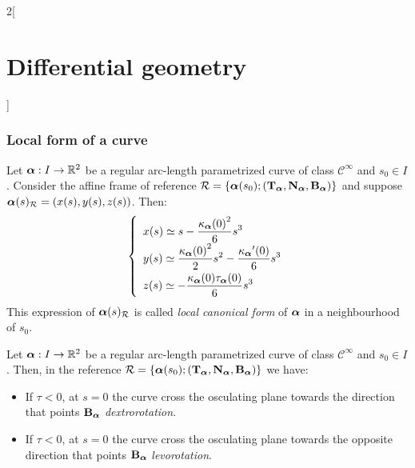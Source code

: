 \documentclass[../../../main.tex]{subfiles}
\begin{document}
\begin{multicols}{2}[\section{Differential geometry}]
  \subsubsection{Local form of a curve}
  \begin{definition}
    Let $\boldsymbol{\mathrm{\alpha}}:I\rightarrow\mathbb{R}^2$ be a regular arc-length parametrized curve of class $\mathcal{C}^\infty$ and $s_0\in I$. Consider the affine frame of reference $\mathcal{R}=\{\boldsymbol{\mathrm{\alpha}}(s_0);({\boldsymbol{\mathrm{T}}_{\boldsymbol{\mathrm{\alpha}}}},{\boldsymbol{\mathrm{N}}_{\boldsymbol{\mathrm{\alpha}}}},{\boldsymbol{\mathrm{B}}_{\boldsymbol{\mathrm{\alpha}}}})\}$ and suppose $\boldsymbol{\mathrm{\alpha}}(s)_{\mathcal{R}}=(x(s),y(s),z(s))$. Then:
    $$\left\{
      \def\arraystretch{2}
      \begin{array}{l}
        \displaystyle x(s)\simeq s-\frac{{\ka\alpha(0)}^2}{6}s^3                          \\
        \displaystyle y(s)\simeq \frac{{\ka\alpha(0)}^2}{2}s^2-\frac{\ka\alpha'(0)}{6}s^3 \\
        \displaystyle z(s)\simeq -\frac{\ka\alpha(0)\ta\alpha(0)}{6}s^3                   \\
      \end{array}
      \right.
    $$
    This expression of $\boldsymbol{\mathrm{\alpha}}(s)_{\mathcal{R}}$ is called \emph{local canonical form} of $\boldsymbol{\mathrm{\alpha}}$ in a neighbourhood of $s_0$.
  \end{definition}
  \begin{corollary}
    Let $\boldsymbol{\mathrm{\alpha}}:I\rightarrow\mathbb{R}^2$ be a regular arc-length parametrized curve of class $\mathcal{C}^\infty$ and $s_0\in I$. Then, in the reference $\mathcal{R}=\{\boldsymbol{\mathrm{\alpha}}(s_0);({\boldsymbol{\mathrm{T}}_{\boldsymbol{\mathrm{\alpha}}}},{\boldsymbol{\mathrm{N}}_{\boldsymbol{\mathrm{\alpha}}}},{\boldsymbol{\mathrm{B}}_{\boldsymbol{\mathrm{\alpha}}}})\}$ we have:
    \begin{itemize}
      \item If $\tau <0$, at $s=0$ the curve cross the osculating plane towards the direction that points ${\boldsymbol{\mathrm{B}}_{\boldsymbol{\mathrm{\alpha}}}}$ \emph{dextrorotation}.
      \item If $\tau <0$, at $s=0$ the curve cross the osculating plane towards the opposite direction that points ${\boldsymbol{\mathrm{B}}_{\boldsymbol{\mathrm{\alpha}}}}$ \emph{levorotation}.
    \end{itemize}
  \end{corollary}

\end{multicols}
\end{document}
